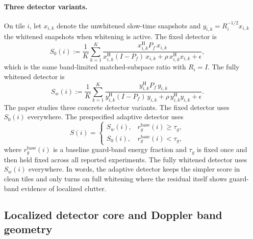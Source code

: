 \documentclass[11pt]{article}
\newcommand{\Hh}{^{\mathrm{H}}}
\newcommand{\Pf}{P_f}
\begin{document}
\paragraph{Three detector variants.}
On tile $i$, let $x_{i,k}$ denote the unwhitened slow-time snapshots and $y_{i,k}=R_i^{-1/2}x_{i,k}$ the whitened snapshots when whitening is active. The fixed detector is
\begin{equation}
  S_{0}(i):=\frac{1}{K}\sum_{k=1}^K
  \frac{x_{i,k}\Hh \Pf\, x_{i,k}}{x_{i,k}\Hh (I-\Pf)\, x_{i,k}+\rho\, x_{i,k}\Hh x_{i,k}+\epsilon},
  \label{eq:s0}
\end{equation}
which is the same band-limited matched-subspace ratio with $R_i=I$. The fully whitened detector is
\begin{equation}
  S_{w}(i):=\frac{1}{K}\sum_{k=1}^K
  \frac{y_{i,k}\Hh \Pf\, y_{i,k}}{y_{i,k}\Hh (I-\Pf)\, y_{i,k}+\rho\, y_{i,k}\Hh y_{i,k}+\epsilon}.
  \label{eq:sw}
\end{equation}
The paper studies three concrete detector variants. The fixed detector uses $S_{0}(i)$ everywhere. The prespecified adaptive detector uses
\begin{equation}
  S(i)=
  \begin{cases}
    S_{w}(i), & r^{\mathrm{base}}_{g}(i)\ge \tau_g,\\
    S_{0}(i), & r^{\mathrm{base}}_{g}(i)<\tau_g,
  \end{cases}
  \label{eq:sadapt}
\end{equation}
where $r^{\mathrm{base}}_{g}(i)$ is a baseline guard-band energy fraction and $\tau_g$ is fixed once and then held fixed across all reported experiments. The fully whitened detector uses $S_{w}(i)$ everywhere. In words, the adaptive detector keeps the simpler score in clean tiles and only turns on full whitening where the residual itself shows guard-band evidence of localized clutter.

\subsection{Localized detector core and Doppler band geometry}
\end{document}
